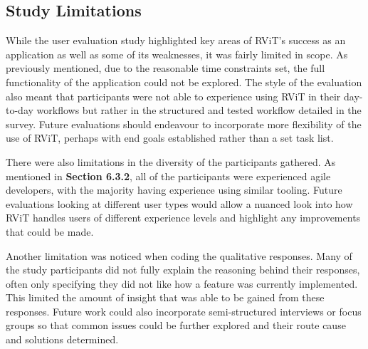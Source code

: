 \documentclass[l4proj.tex]{subfiles}
\begin{document}
\subsection{Study Limitations}
While the user evaluation study highlighted key areas of RViT's success as an application as well as some of its weaknesses, it was fairly limited in scope. As previously mentioned, due to the reasonable time constraints set, the full functionality of the application could not be explored. The style of the evaluation also meant that participants were not able to experience using RViT in their day-to-day workflows but rather in the structured and tested workflow detailed in the survey. Future evaluations should endeavour to incorporate more flexibility of the use of RViT, perhaps with end goals established rather than a set task list.

There were also limitations in the diversity of the participants gathered. As mentioned in \textbf{Section 6.3.2}, all of the participants were experienced agile developers, with the majority having experience using similar tooling. Future evaluations looking at different user types would allow a nuanced look into how RViT handles users of different experience levels and highlight any improvements that could be made.

Another limitation was noticed when coding the qualitative responses. Many of the study participants did not fully explain the reasoning behind their responses, often only specifying they did not like how a feature was currently implemented. This limited the amount of insight that was able to be gained from these responses. Future work could also incorporate semi-structured interviews or focus groups so that common issues could be further explored and their route cause and solutions determined. 
\end{document}

